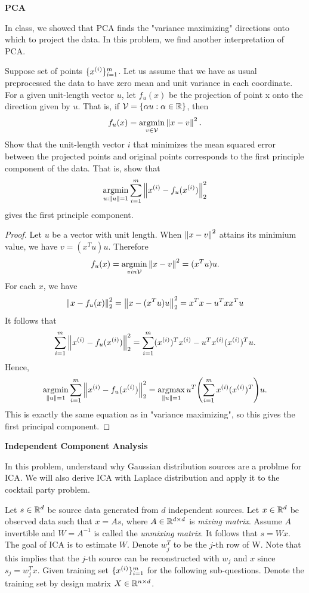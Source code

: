 \documentclass[12pt,letterpaper,boxed]{hmcpset}
\DeclareMathOperator*{\argmax}{argmax}
\DeclareMathOperator*{\argmin}{argmin}
\newcommand{\summ}{\sum_{i=1}^m}
\begin{document}
\newpage
\begin{problem}[Problem 3]
  \textbf{PCA}

  In class, we showed that PCA finds the "variance maximizing" directions onto which to project the data. In this problem, we find another interpretation of PCA.

  Suppose set of points $\{ \xx\}_{i=1}^m$. Let us assume that we have as usual preprocessed the data to have zero mean and unit variance in each coordinate. For a given unit-length vector $u$, let $f_u(x)$ be the projection of point x onto the direction given by $u$. That is, if $\mathcal{V} = \{ \alpha u: \alpha \in \mathbb{R} \}$, then
  \[
  f_{u}(x) = \argmin_{v \in \mathcal{V}} \norm{x - v}^2.
  \]
  Show that the unit-length vector $i$ that minimizes the mean squared error between the projected points and original points corresponds to the first principle component of the data. That is, show that
  \[
  \argmin_{u: \norm{u} = 1} \sum_{i=1}^m \norm{\xx - f_u(\xx)}^2_2
  \]
  gives the first principle component.
\end{problem}

\begin{solution}
  \begin{proof}
    Let $u$ be a vector with unit length. When $\left\lVert x-v\right\rVert^2$ attains its minimium value, we have $v = (x^T u) u$. Therefore
    \[
    f_u(x) = \argmin_{v in \mathcal{V}} \norm{x - v}^2 = (x^T u) u.
    \]
    For each $x$, we have
    \[
    \begin{aligned}
      \left\lVert x - f_u(x)\right\rVert_2^2 = \left\lVert x - (x^T u) u\right\rVert_2^2 = x^T x - u^T x x^T u
    \end{aligned}
    \]
    It follows that
    \[
    \summ \norm{\xx - f_u(\xx)}_2^2 = \summ (\xx)^T \xx - u^T \xx (\xx)^T u.
    \]
    Hence,
    \[
    \argmin_{\norm{u} = 1} \summ \norm{\xx - f_u(\xx)}_2^2 = \argmax_{\norm{u} = 1} u^T \qty(\summ \xx (\xx)^T) u.
    \]
    This is exactly the same equation as in "variance maximizing", so this gives the first principal component.
  \end{proof}
\end{solution}

\newpage
\begin{problem}[Problem 4]
  \textbf{Independent Component Analysis}

  In this problem, understand why Gaussian distribution sources are a problme for ICA. We will also derive ICA with Laplace distribution and apply it to the cocktail party problem.

  Let $s \in \mathbb{R}^d$ be source data generated from $d$ independent sources. Let $x \in \mathbb{R}^d$ be observed data such that $x = As$, where $A \in \mathbb{R}^{d \times d}$ is \emph{mixing matrix}. Assume $A$ invertible and $W = A^{-1}$ is called the \emph{unmixing matrix}. It follows that $s = Wx$. The goal of ICA is to estimate $W$. Denote $w_j^T$ to be the $j$-th row of W. Note that this implies that the $j$-th source can be reconstructed with $w_j$ and $x$ since $s_j = w_j^T x$. Given training set $\{\xx\}_{i=1}^m$ for the following sub-questions. Denote the training set by design matrix $X \in \mathbb{R}^{n \times d}$.
\end{problem}
\end{document}
